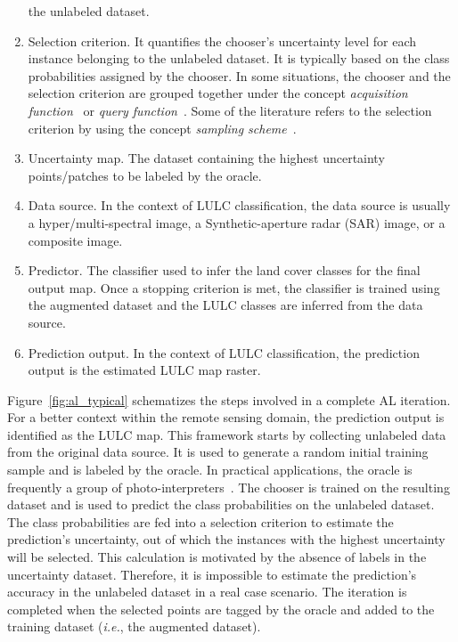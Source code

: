 \documentclass[preprint,12pt]{elsarticle}
\begin{document}
\begin{enumerate}
        the unlabeled dataset.
    \item Selection criterion. It quantifies the chooser's uncertainty level
        for each instance belonging to the unlabeled dataset. It is typically
        based on the class probabilities assigned by the chooser. In some
        situations, the chooser and the selection criterion are grouped
        together under the concept \textit{acquisition
        function}~\cite{Ruzicka2020} or \textit{query function}~\cite{Su2020}.
        Some of the literature refers to the selection criterion by using the
        concept \textit{sampling scheme}~\cite{Liu2020}.
    \item Uncertainty map. The dataset containing the highest uncertainty
        points/patches to be labeled by the oracle.
    \item Data source. In the context of LULC classification, the data source
        is usually a hyper/multi-spectral image, a Synthetic-aperture radar
        (SAR) image, or a composite image.
    \item Predictor. The classifier used to infer the land cover classes for
        the final output map. Once a stopping criterion is met, the classifier
        is trained using the augmented dataset and the LULC classes are
        inferred from the data source.
    \item Prediction output. In the context of LULC classification, the
        prediction output is the estimated LULC map raster.
\end{enumerate}

Figure~\ref{fig:al_typical} schematizes the steps involved in a complete AL
iteration. For a better context within the remote sensing domain, the
prediction output is identified as the LULC map. This framework starts by
collecting unlabeled data from the original data source. It is used to
generate a random initial training sample and is labeled by the oracle. In
practical applications, the oracle is frequently a group of
photo-interpreters~\cite{Kottke2017}. The chooser is trained on the resulting
dataset and is used to predict the class probabilities on the unlabeled
dataset. The class probabilities are fed into a selection criterion to
estimate the prediction's uncertainty, out of which the instances with the
highest uncertainty will be selected. This calculation is motivated by the
absence of labels in the uncertainty dataset. Therefore, it is impossible to
estimate the prediction's accuracy in the unlabeled dataset in a real case
scenario. The iteration is completed when the selected points are tagged by
the oracle and added to the training dataset (\textit{i.e.}, the augmented
dataset). 
\end{document}
